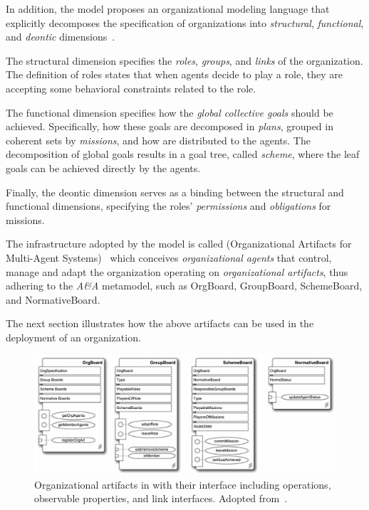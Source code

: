 In addition, the \moiseplus{} model proposes an organizational modeling language that explicitly decomposes the specification of organizations into \textit{structural}, \textit{functional}, and \textit{deontic} dimensions~\cite{doi:10.1504/IJAOSE.2007.016266}\cite{10.1145/544741.544858}.

The structural dimension specifies the \textit{roles}, \textit{groups}, and \textit{links} of the organization.
The definition of roles states that when agents decide to play a role, they are accepting some behavioral constraints related to the role.

The functional dimension specifies how the \textit{global collective goals} should be achieved.
Specifically, how these goals are decomposed in \textit{plans}, grouped in coherent sets by \textit{missions}, and how are distributed to the agents.
The decomposition of global goals results in a goal tree, called \textit{scheme}, where the leaf goals can be achieved directly by the agents.

Finally, the deontic dimension serves as a binding between the structural and functional dimensions, specifying the roles' \textit{permissions} and \textit{obligations} for missions.

The infrastructure adopted by the \moiseplus{} model is called \oraformas{} (Organizational Artifacts for Multi-Agent Systems)~\cite{hubner2010} which conceives \textit{organizational agents} that control, manage and adapt the organization operating on \textit{organizational artifacts}, thus adhering to the \textit{A\&A} metamodel, such as \textsf{OrgBoard}, \textsf{GroupBoard}, \textsf{SchemeBoard}, and \textsf{NormativeBoard}.

The next section illustrates how the above artifacts can be used in the deployment of an organization.

\begin{figure}[H]
    \centering
    \includegraphics[width=\linewidth]{images/org-artifacts.png}
    \caption{Organizational artifacts in \oraformas{} with their interface including operations, observable properties, and link interfaces. Adopted from~\cite{hubner2010}.}
    \label{fig:org-artifacts}
\end{figure}

